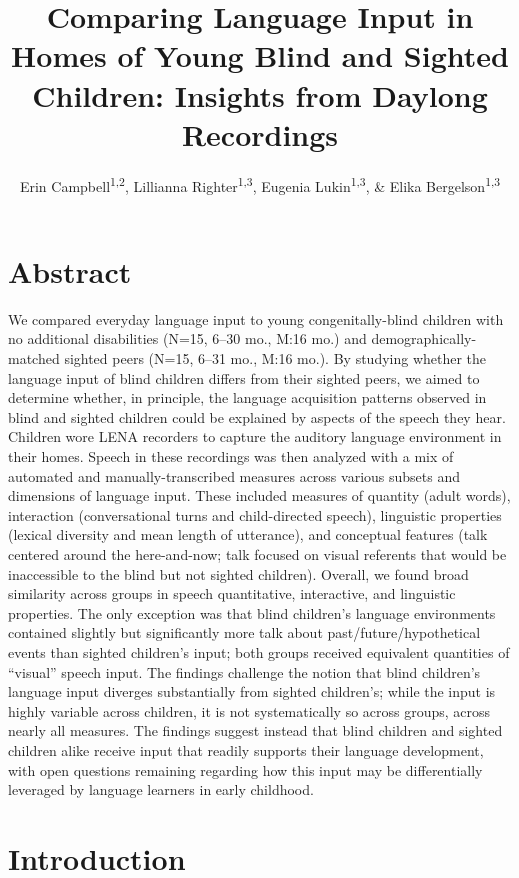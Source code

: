 \documentclass[
  man,floatsintext]{apa6}
\title{Comparing Language Input in Homes of Young Blind and Sighted Children: Insights from Daylong Recordings}
\author{Erin Campbell\textsuperscript{1,2}, Lillianna Righter\textsuperscript{1,3}, Eugenia Lukin\textsuperscript{1,3}, \& Elika Bergelson\textsuperscript{1,3}}
\date{}
\affiliation{\vspace{0.5cm}\textsuperscript{1} Department of Psychology \& Neuroscience, Duke University, Durham, NC\\\textsuperscript{2} Wheelock College of Education \& Human Development, Boston University, Boston, MA\\\textsuperscript{3} Department of Psychology, Harvard University, Cambridge, MA}
\begin{document}
\maketitle

\hypertarget{abstract}{%
\section{Abstract}\label{abstract}}

We compared everyday language input to young congenitally-blind children with no additional disabilities (N=15, 6--30 mo., M:16 mo.) and demographically-matched sighted peers (N=15, 6--31 mo., M:16 mo.). By studying whether the language input of blind children differs from their sighted peers, we aimed to determine whether, in principle, the language acquisition patterns observed in blind and sighted children could be explained by aspects of the speech they hear. Children wore LENA recorders to capture the auditory language environment in their homes. Speech in these recordings was then analyzed with a mix of automated and manually-transcribed measures across various subsets and dimensions of language input. These included measures of quantity (adult words), interaction (conversational turns and child-directed speech), linguistic properties (lexical diversity and mean length of utterance), and conceptual features (talk centered around the here-and-now; talk focused on visual referents that would be inaccessible to the blind but not sighted children). Overall, we found broad similarity across groups in speech quantitative, interactive, and linguistic properties. The only exception was that blind children's language environments contained slightly but significantly more talk about past/future/hypothetical events than sighted children's input; both groups received equivalent quantities of ``visual'' speech input. The findings challenge the notion that blind children's language input diverges substantially from sighted children's; while the input is highly variable across children, it is not systematically so across groups, across nearly all measures. The findings suggest instead that blind children and sighted children alike receive input that readily supports their language development, with open questions remaining regarding how this input may be differentially leveraged by language learners in early childhood.

\hypertarget{introduction}{%
\section{Introduction}\label{introduction}}
\end{document}
